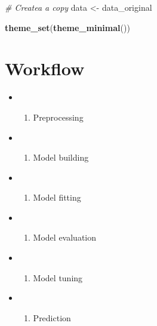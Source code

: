 \documentclass[
]{book}
\newenvironment{Shaded}{\begin{snugshade}}{\end{snugshade}}
\newcommand{\CommentTok}[1]{\textcolor[rgb]{0.56,0.35,0.01}{\textit{#1}}}
\newcommand{\KeywordTok}[1]{\textcolor[rgb]{0.13,0.29,0.53}{\textbf{#1}}}
\newcommand{\NormalTok}[1]{#1}
\newcommand{\StringTok}[1]{\textcolor[rgb]{0.31,0.60,0.02}{#1}}
\providecommand{\tightlist}{%
  \setlength{\itemsep}{0pt}\setlength{\parskip}{0pt}}
\begin{document}
\begin{Shaded}
\begin{Highlighting}[]
\CommentTok{\# Createa a copy}
\NormalTok{data \textless{}{-}}\StringTok{ }\NormalTok{data\_original}

\KeywordTok{theme\_set}\NormalTok{(}\KeywordTok{theme\_minimal}\NormalTok{())}
\end{Highlighting}
\end{Shaded}

\hypertarget{workflow-3}{%
\section{Workflow}\label{workflow-3}}

\begin{itemize}
\item
  \begin{enumerate}
  \def\labelenumi{\arabic{enumi}.}
  \tightlist
  \item
    Preprocessing
  \end{enumerate}
\item
  \begin{enumerate}
  \def\labelenumi{\arabic{enumi}.}
  \setcounter{enumi}{1}
  \tightlist
  \item
    Model building
  \end{enumerate}
\item
  \begin{enumerate}
  \def\labelenumi{\arabic{enumi}.}
  \setcounter{enumi}{2}
  \tightlist
  \item
    Model fitting
  \end{enumerate}
\item
  \begin{enumerate}
  \def\labelenumi{\arabic{enumi}.}
  \setcounter{enumi}{3}
  \tightlist
  \item
    Model evaluation
  \end{enumerate}
\item
  \begin{enumerate}
  \def\labelenumi{\arabic{enumi}.}
  \setcounter{enumi}{4}
  \tightlist
  \item
    Model tuning
  \end{enumerate}
\item
  \begin{enumerate}
  \def\labelenumi{\arabic{enumi}.}
  \setcounter{enumi}{5}
  \tightlist
  \item
    Prediction
  \end{enumerate}
\end{itemize}
\end{document}
